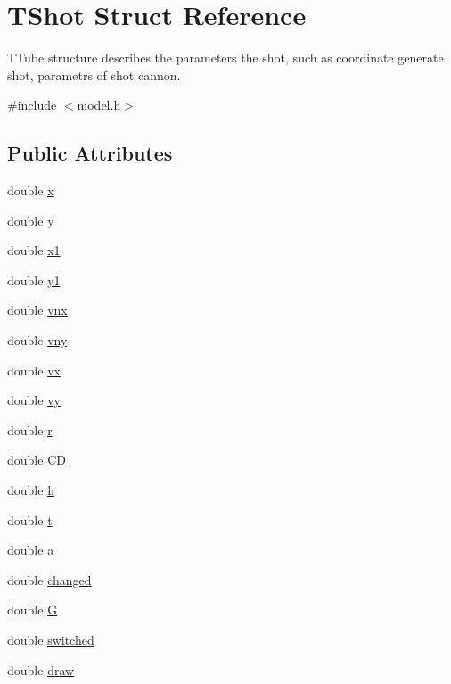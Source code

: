 \hypertarget{struct_t_shot}{}\section{T\+Shot Struct Reference}
\label{struct_t_shot}


T\+Tube structure describes the parameters the shot, such as coordinate generate shot, parametrs of shot cannon.  




{\ttfamily \#include $<$model.\+h$>$}

\subsection*{Public Attributes}
\begin{DoxyCompactItemize}
\item 
double \hyperlink{struct_t_shot_a20e267b4a3e1f0feca9ff50c6c8dd460}{x}
\item 
double \hyperlink{struct_t_shot_a04381372a3ffa1796de43381ab1409f6}{y}
\item 
double \hyperlink{struct_t_shot_a04c0ba5caa1ea9ab2be4f282d44423bb}{x1}
\item 
double \hyperlink{struct_t_shot_ad00c30f4c3b310313614c3f9690ff3af}{y1}
\item 
double \hyperlink{struct_t_shot_ae4ea609121b150dcf98e1a32337d82aa}{vnx}
\item 
double \hyperlink{struct_t_shot_a169ab83d9080694ea052b912f257e1df}{vny}
\item 
double \hyperlink{struct_t_shot_add4d9845cee9082a489e2aae73a20891}{vx}
\item 
double \hyperlink{struct_t_shot_a3ad1d2834c4be13bcdf488ef57de8311}{vy}
\item 
double \hyperlink{struct_t_shot_aa69b952f8f184fec8e1e394e2de3448d}{r}
\item 
double \hyperlink{struct_t_shot_a0b8bd704b499d9e24249e5c35e526fc4}{CD}
\item 
double \hyperlink{struct_t_shot_a78e053ce9c33e588e8c6220c19163f77}{h}
\item 
double \hyperlink{struct_t_shot_a59b926a3fb4948c0b3d18fb0c480b794}{t}
\item 
double \hyperlink{struct_t_shot_a15a6a1f4d0e4fa8d2922746d3718c645}{a}
\item 
double \hyperlink{struct_t_shot_ac06afbb79a97feeef328bd6e985105ae}{changed}
\item 
double \hyperlink{struct_t_shot_aca3a4d1732cb311375e514137d8ddae2}{G}
\item 
double \hyperlink{struct_t_shot_a5c967558fbed8590fe788a4d68323739}{switched}
\item 
double \hyperlink{struct_t_shot_aec72c87adc6f131dc80d154480edf585}{draw}
\end{DoxyCompactItemize}


